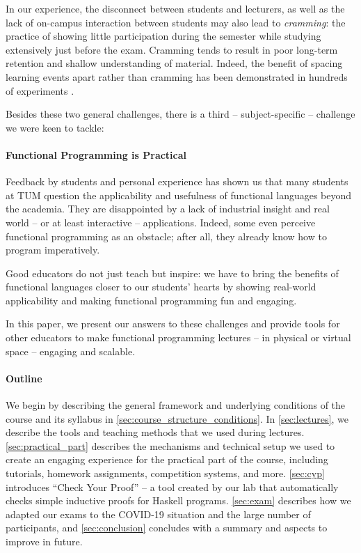 In our experience, the disconnect between students and lecturers, as well as the lack of on-campus interaction between students may also lead to \emph{cramming}:
the practice of showing little participation during the semester
while studying extensively just before the exam.
Cramming tends to result in poor long-term retention and shallow understanding of material.
Indeed, the benefit of spacing learning events apart rather than cramming has been demonstrated in hundreds of experiments \cite{cramming1,cramming2}.

\vspace{\baselineskip}\noindent
Besides these two general challenges,
there is a third -- subject-specific --
challenge we were keen to tackle:

\paragraph{Functional Programming is Practical }
Feedback by students and personal experience has shown us that many students
at TUM question the applicability and usefulness
of functional languages beyond
the academia.
They are disappointed by a lack of industrial insight
and real world -- or at least interactive -- applications.
Indeed, some even perceive functional programming as an obstacle;
after all, they already know how to program imperatively.

Good educators do not just teach but inspire:
we have to bring the benefits of functional languages
closer to our students' hearts
by showing real-world applicability and making functional programming fun and engaging.


\vspace{\baselineskip}\noindent
In this paper,
we present our answers to these challenges
and provide tools for other educators
to make functional programming lectures -- in physical or virtual space -- engaging and scalable.

\paragraph{Outline}

We begin by describing the general framework and underlying conditions of the course and its syllabus in \cref{sec:course_structure_conditions}.
In \cref{sec:lectures},
we describe the tools and teaching methods that we used during lectures.
\cref{sec:practical_part} describes the
mechanisms and technical setup
we used to create an engaging experience
for the practical part of the course,
including tutorials, homework assignments,
competition systems, and more.
\cref{sec:cyp} introduces
``Check Your Proof'' -- a tool created
by our lab that automatically checks simple inductive proofs for Haskell programs.
\cref{sec:exam} describes how we adapted our exams to the COVID-19 situation and the large number of participants,
and \cref{sec:conclusion} concludes with a summary and aspects to improve in future.

